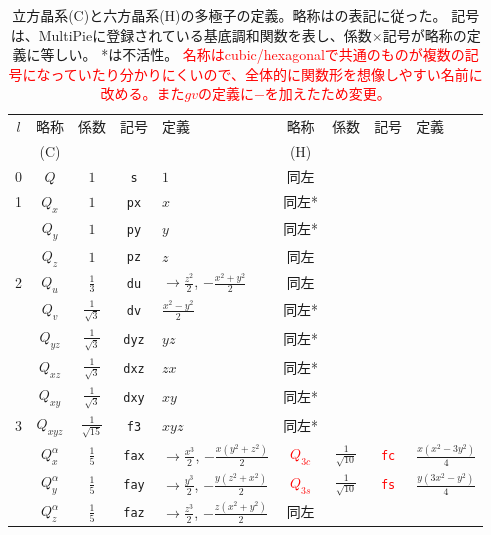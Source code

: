 \documentclass[11pt]{easymemo}
\begin{document}
\begin{table}[ht!]
\begin{center}
\caption{立方晶系(C)と六方晶系(H)の多極子の定義。略称は\cite{Hayami18,Yatsushiro22}の表記に従った。
記号は、MultiPieに登録されている基底調和関数を表し、係数$\times$記号が略称の定義に等しい。
*は不活性。
\textcolor{red}{名称はcubic/hexagonalで共通のものが複数の記号になっていたり分かりにくいので、全体的に関数形を想像しやすい名前に改める。また$gv$の定義に$-$を加えたため変更。}
\label{tbl:muldef}}
\renewcommand{\arraystretch}{1.3}
\scriptsize
\begin{tabular}{c||c|c|c|l||c|c|c|l} \hline \hline
$l$ & 略称 & 係数 & 記号 & 定義 & 略称 & 係数 & 記号 & 定義 \\
& (C) & & & & (H) & & & \\ \hline
0 & $Q$ & $1$ & \texttt{s} & $ 1 $ & 同左 & & & \\
\hline
1 & $Q_x$ & $1$ & \texttt{px} & $ x $ & 同左* & & & \\
  & $Q_y$ & $1$ & \texttt{py} & $ y $ & 同左* & & & \\
  & $Q_z$ & $1$ & \texttt{pz} & $ z $ & 同左 & & & \\
\hline
2 & $Q_u$ & $\frac{1}{3}$ & \texttt{du} & $\to\frac{z^2}{2}$, $-\frac{x^2+y^2}{2}$ & 同左 & & & \\
  & $Q_v$ & $\frac{1}{\sqrt{3}}$ & \texttt{dv} & $ \frac{x^2 - y^2}{2} $ & 同左* & & & \\
  & $Q_{yz}$ & $\frac{1}{\sqrt{3}}$ & \texttt{dyz} & $ y z $ & 同左* & & & \\
  & $Q_{xz}$ & $\frac{1}{\sqrt{3}}$ & \texttt{dxz} & $ z x $ & 同左* & & & \\
  & $Q_{xy}$ & $\frac{1}{\sqrt{3}}$ & \texttt{dxy} & $ x y $ & 同左* & & & \\
 \hline
3 & $Q_{xyz}$ & $\frac{1}{\sqrt{15}}$ & \texttt{f3} & $ x y z $ & 同左* & & & \\
  & $Q_x^\alpha$ & $\frac{1}{5}$ & \texttt{fax} & $\to\frac{x^3}{2}$, $-\frac{x(y^2+z^2)}{2}$ &
\textcolor{red}{$Q_{3c}$} & $\frac{1}{\sqrt{10}}$ & \textcolor{red}{\texttt{fc}} & $ \frac{x(x^{2}-3y^{2})}{4}$ \\
  & $Q_y^\alpha$ & $\frac{1}{5}$ & \texttt{fay} & $\to\frac{y^3}{2}$, $-\frac{y(z^2+x^2)}{2}$ &
\textcolor{red}{$Q_{3s}$} & $\frac{1}{\sqrt{10}}$ & \textcolor{red}{\texttt{fs}} & $ \frac{y(3x^{2}-y^{2})}{4}$ \\
  & $Q_z^\alpha$ & $\frac{1}{5}$ & \texttt{faz} & $\to\frac{z^3}{2}$, $-\frac{z(x^2+y^2)}{2}$ & 同左 & & & \\

\end{tabular}
\end{center}
\end{table}
\end{document}
